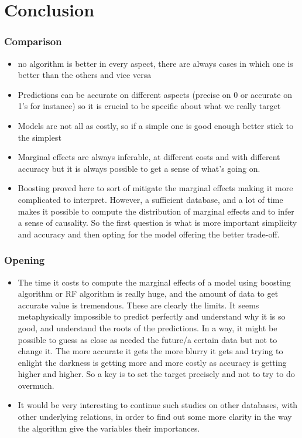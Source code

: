 \chapter{Conclusion}

\subsection{Comparison}

\begin{itemize}
    \item no algorithm is better in every aspect, there are always cases in which one is better than the others and vice versa
    \item Predictions can be accurate on different aspects (precise on 0 or accurate on 1’s for instance) so it is crucial to be specific about what we really target
    \item Models are not all as costly, so if a simple one is good enough better stick to the simplest
    \item Marginal effects are always inferable, at different costs and with different accuracy but it is always possible to get a sense of what’s going on.
    \item Boosting proved here to sort of mitigate the marginal effects making it more complicated to interpret. However, a sufficient database, and a lot of time makes it possible to compute the distribution of marginal effects and to infer a sense of causality.
    So the first question is what is more important simplicity and accuracy and then opting for the model offering the better trade-off.
\end{itemize}

\subsection{Opening}

\begin{itemize}
    \item The time it costs to compute the marginal effects of a model using boosting algorithm or RF algorithm is really huge, and the amount of data to get accurate value is tremendous. These are clearly the limits. It seems metaphysically impossible to predict perfectly and understand why it is so good, and understand the roots of the predictions. In a way, it might be possible to guess as close as needed the future/a certain data but not to change it. The more accurate it gets the more blurry it gets and trying to enlight the darkness is getting more and more costly as accuracy is getting higher and higher. So a key is to set the target precisely and not to try to do overmuch.
    \item It would be very interesting to continue such studies on other databases, with other underlying relations, in order to find out some more clarity in the way the algorithm give the variables their importances.
\end{itemize}
